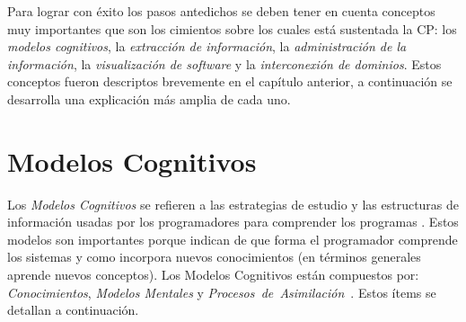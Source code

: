 Para lograr con éxito los pasos antedichos se deben tener en cuenta conceptos muy importantes que son los cimientos sobre los cuales está sustentada la CP: los \textit{modelos cognitivos}, la \textit{extracción de información}, la \textit{administración de la información}, la \textit{visualización de software} y la \textit{interconexión de dominios}. Estos conceptos fueron descriptos brevemente en el capítulo anterior, a continuación se desarrolla una explicación más amplia de cada uno.

\section{Modelos Cognitivos}

Los \textit{Modelos Cognitivos} se refieren a las estrategias de estudio y las estructuras de información usadas por los programadores para comprender los programas \cite{TIE89,VMAVA95,BROOK82,STOREY99}. Estos modelos  son importantes porque indican de que forma el programador comprende los sistemas y como incorpora nuevos conocimientos (en términos generales aprende nuevos conceptos).
Los Modelos Cognitivos están compuestos por: \textit{Conocimientos}, \textit{Modelos Mentales} y \mbox{\textit{Procesos de Asimilación} \cite{MBPHRU10}.} Estos ítems se detallan a continuación.

